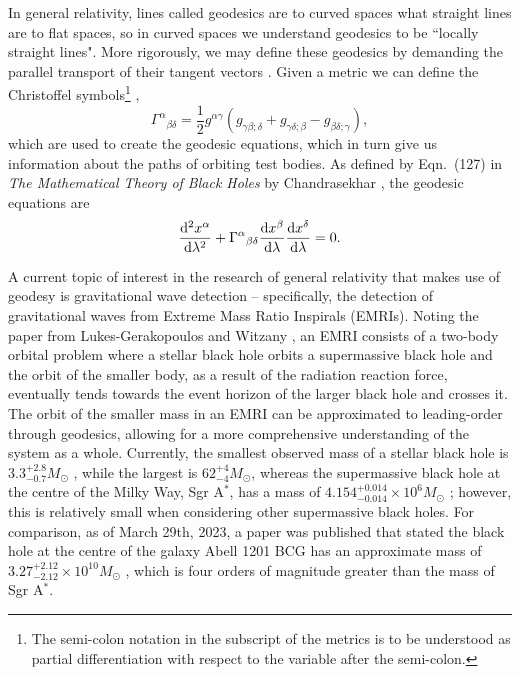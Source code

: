 In general relativity, lines called geodesics are to curved spaces what straight lines are to flat spaces, so in curved spaces we understand geodesics to be ``locally straight lines".
More rigorously, we may define these geodesics by demanding the parallel transport of their tangent vectors \cite{schutzFirstGR}.
Given a metric we can define the Christoffel symbols\footnote{The semi-colon notation in the subscript of the metrics is to be understood as partial differentiation with respect to the variable after the semi-colon.} \cite{einsteinFieldEquations},
\begin{equation}\label{eqn:christoffel}
\Gamma^\alpha{}_{\beta\delta}=\frac{1}{2}g^{\alpha \gamma}(g_{\gamma\beta;\delta}+g_{\gamma\delta;\beta}-g_{\beta\delta;\gamma}),
\end{equation}
which are used to create the geodesic equations, which in turn give us information about the paths of orbiting test bodies.
As defined by Eqn.~(127) in \textit{The Mathematical Theory of Black Holes} by Chandrasekhar \cite{chandraBook}, the geodesic equations are
\begin{equation}\label{eqn:geodesic_eqn}
    \dv[2]{x^\alpha}{\lambda}+\Gamma^{\alpha}{}_{\beta\delta}\dv{x^\beta}{\lambda}\dv{x^\delta}{\lambda}=0.
\end{equation}

A current topic of interest in the research of general relativity that makes use of geodesy is gravitational wave detection -- specifically, the detection of gravitational waves from Extreme Mass Ratio Inspirals (EMRIs).
Noting the paper from Lukes-Gerakopoulos and Witzany \cite{emriExplained}, an EMRI consists of a two-body orbital problem where a stellar black hole orbits a supermassive black hole and the orbit of the smaller body, as a result of the radiation reaction force, eventually tends towards the event horizon of the larger black hole and crosses it.
The orbit of the smaller mass in an EMRI can be approximated to leading-order through geodesics, allowing for a more comprehensive understanding of the system as a whole.
Currently, the smallest observed mass of a stellar black hole is $3.3^{+2.8}_{-0.7}M_{\odot}$ \cite{smallStellar}, while the largest is $62^{+4}_{-4}M_{\odot}$, whereas the supermassive black hole at the centre of the Milky Way, Sgr A$^*$, has a mass of $4.154^{+0.014}_{-0.014}\times 10^6 M_{\odot}$ \cite{SgrAMass}; however, this is relatively small when considering other supermassive black holes.
For comparison, as of March 29th, 2023, a paper was published that stated the black hole at the centre of the galaxy Abell 1201 BCG has an approximate mass of $3.27^{+2.12}_{-2.12}\times 10^{10} M_{\odot}$ \cite{abellSMBH}, which is four orders of magnitude greater than the mass of Sgr A$^*$.

